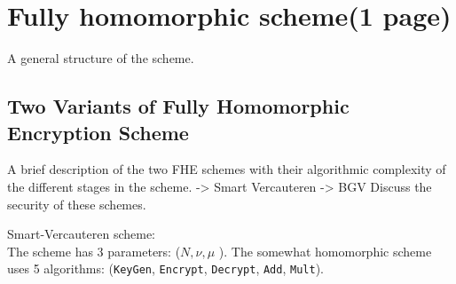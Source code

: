 \documentclass{acm_proc_article-sp}
\begin{document}
\section{Fully homomorphic scheme(1 page)}
A general structure of the scheme.
\subsection{Two Variants of Fully Homomorphic Encryption Scheme}
A brief description of the two FHE schemes with their algorithmic complexity of the different stages in the scheme. 
-> Smart Vercauteren
-> BGV
Discuss the security of these schemes.



Smart-Vercauteren scheme:\\
The scheme \cite{cryptoeprint:2009:571} has 3 parameters: ($N, \nu, \mu$ ). The somewhat homomorphic scheme uses 5 algorithms: (\texttt{KeyGen}, \texttt{Encrypt}, \texttt{Decrypt}, \texttt{Add}, \texttt{Mult}).




\linesnumbered
\end{document}
